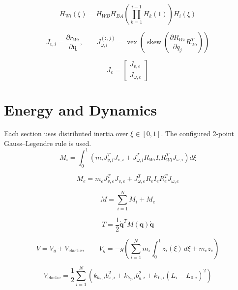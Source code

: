 \documentclass[11pt]{article}
\begin{document}
\begin{equation}
H_{Wi}(\xi)=H_{WB}H_{BA}\left(\prod_{k=1}^{i-1}H_k(1)\right)H_i(\xi)
\end{equation}

\begin{equation}
J_{v,i}=\frac{\partial r_{Wi}}{\partial\boldsymbol q},\qquad J_{\omega,i}^{(:,j)}=\operatorname{vex}\!\left(\operatorname{skew}\!\left(\frac{\partial R_{Wi}}{\partial q_j}R_{Wi}^{T}\right)\right)
\end{equation}

\begin{equation}
J_e=\begin{bmatrix}J_{v,e}\\J_{\omega,e}\end{bmatrix}
\end{equation}


\section{Energy and Dynamics}
Each section uses distributed inertia over $\xi\in[0,1]$. The configured 2-point Gauss--Legendre rule is used.
\begin{equation}
M_i=\int_0^1\!\left(m_iJ_{v,i}^{T}J_{v,i}+J_{\omega,i}^{T}R_{Wi}I_iR_{Wi}^{T}J_{\omega,i}\right)d\xi
\end{equation}

\begin{equation}
M_e=m_eJ_{v,e}^{T}J_{v,e}+J_{\omega,e}^{T}R_eI_eR_e^TJ_{\omega,e}
\end{equation}

\begin{equation}
M=\sum_{i=1}^{N}M_i+M_e\label{eq:mass-assembly}
\end{equation}

\begin{equation}
T=\frac12\dot{\boldsymbol q}^{T}M(\boldsymbol q)\dot{\boldsymbol q}
\end{equation}

\begin{equation}
V=V_g+V_{\mathrm{elastic}},\qquad V_g=-g\!\left(\sum_{i=1}^{N}m_i\int_0^1z_i(\xi)\,d\xi+m_ez_e\right)
\end{equation}

\begin{equation}
V_{\mathrm{elastic}}=\frac12\sum_{i=1}^{N}\left(k_{b_x,i}b_{x,i}^{2}+k_{b_y,i}b_{y,i}^{2}+k_{L,i}(L_i-L_{0,i})^2\right)
\end{equation}
\end{document}
